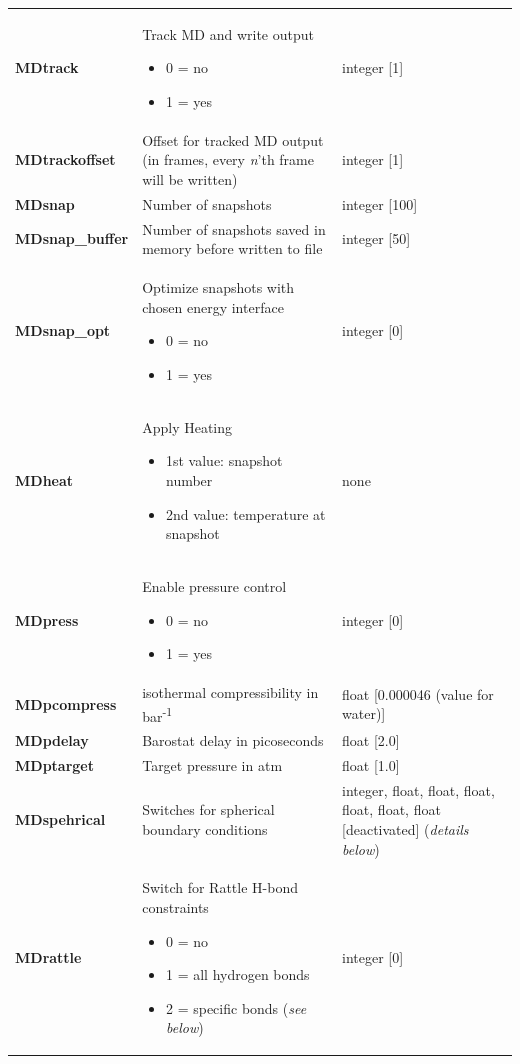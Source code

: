 \documentclass[10pt,a4paper]{article} %
\begin{document}
\begin{longtable}{|p{4cm}|p{4.5cm}|p{3cm}|}
		\textbf{MDtrack} & Track MD and write output\begin{itemize} \item 0 = no \item 1 = yes\end{itemize}& integer [1] \\
		\textbf{MDtrackoffset} & Offset for tracked MD output (in frames, every \textit{n}'th frame will be written)& integer [1] \\
		\textbf{MDsnap} & Number of snapshots & integer [100] \\
		\textbf{MDsnap\_buffer} & Number of snapshots saved in memory before written to file & integer [50] \\
		\textbf{MDsnap\_opt} & Optimize snapshots with chosen energy interface\begin{itemize} \item 0 = no \item 1 = yes\end{itemize} & integer [0] \\
		\textbf{MDheat}  & Apply Heating \begin{itemize}\item1st value: snapshot number\item2nd value: temperature at snapshot\end{itemize} & none\\
		\textbf{MDpress} & Enable pressure control\begin{itemize} \item 0 = no \item 1 = yes\end{itemize}& integer [0]\\
		\textbf{MDpcompress} & isothermal compressibility in bar\textsuperscript{-1} & float [0.000046 (value for water)] \\ 
		\textbf{MDpdelay} & Barostat delay in picoseconds & float [2.0]\\
		\textbf{MDptarget} & Target pressure in atm & float [1.0] \\
		\textbf{MDspehrical} & Switches for spherical boundary conditions & integer, float, float, float, float, float, float [deactivated] (\textit{details below}) \\
		\textbf{MDrattle} & Switch for Rattle\supercite{rattle} H-bond constraints\begin{itemize} \item 0 = no \item 1 = all hydrogen bonds \item 2 = specific bonds (\textit{see below}) \end{itemize} & integer [0] \\

\end{longtable}
\end{document}
